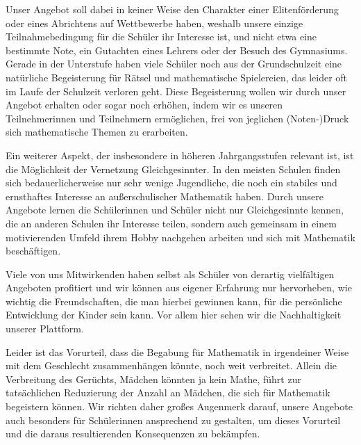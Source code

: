 \documentclass[12pt]{zettel}
\begin{document}
Unser Angebot soll dabei in keiner Weise den Charakter einer
Elitenförderung oder eines Abrichtens auf Wettbewerbe haben, weshalb
unsere einzige Teilnahmebedingung für die Schüler ihr Interesse ist,
und nicht etwa eine bestimmte Note, ein Gutachten eines Lehrers
oder der Besuch des Gymnasiums. Gerade in der Unterstufe haben viele
Schüler noch aus der Grundschulzeit eine natürliche Begeisterung für
Rätsel und mathematische Spielereien, das leider oft im Laufe der
Schulzeit verloren geht. Diese Begeisterung wollen wir
durch unser Angebot erhalten oder sogar noch erhöhen, indem wir es
unseren Teilnehmerinnen und Teilnehmern ermöglichen, frei von jeglichen
(Noten-)Druck sich mathematische Themen zu erarbeiten.

Ein weiterer Aspekt, der insbesondere in höheren Jahrgangsstufen
relevant ist, ist die Möglichkeit der Vernetzung Gleichgesinnter. In
den meisten Schulen finden sich bedauerlicherweise nur sehr wenige
Jugendliche, die noch ein stabiles und ernsthaftes Interesse an
außerschulischer Mathematik haben. Durch unsere Angebote lernen die
Schülerinnen und Schüler nicht nur Gleichgesinnte kennen, die an
anderen Schulen ihr Interesse teilen, sondern auch gemeinsam in einem
motivierenden Umfeld ihrem Hobby nachgehen arbeiten und
sich mit Mathematik beschäftigen.

Viele von uns Mitwirkenden haben selbst als Schüler von derartig
vielfältigen Angeboten profitiert und wir können aus eigener Erfahrung nur
hervorheben, wie wichtig die Freundschaften, die man hierbei gewinnen kann,
für die persönliche Entwicklung der Kinder sein kann. Vor allem hier sehen
wir die Nachhaltigkeit unserer Plattform.

Leider ist das Vorurteil, dass die Begabung für Mathematik in
irgendeiner Weise mit dem Geschlecht zusammenhängen könnte, noch weit
verbreitet. Allein die Verbreitung des Gerüchts, Mädchen könnten ja
kein Mathe, führt zur tatsächlichen Reduzierung der Anzahl
an Mädchen, die sich für Mathematik begeistern können. Wir richten
daher großes Augenmerk darauf, unsere Angebote auch besonders für
Schülerinnen ansprechend zu gestalten, um dieses Vorurteil und die
daraus resultierenden Konsequenzen zu bekämpfen.
\end{document}
